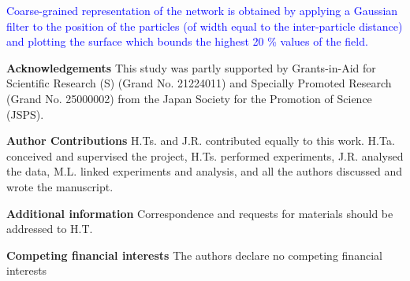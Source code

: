 \documentclass[preprint,amsmath,amssymb,superscriptaddress]{revtex4-1}
\begin{document}
\textcolor{blue}{Coarse-grained representation of the network is obtained by applying a Gaussian filter to the position of the particles (of width equal to the inter-particle distance) and plotting the surface which bounds the highest 20 \% values of the field.}





\bigskip
\noindent
{\bf Acknowledgements} 
This study was partly supported by Grants-in-Aid for Scientific Research (S) (Grand No. 21224011) and Specially Promoted Research (Grand No. 25000002) from the Japan Society for the Promotion of Science (JSPS). 

\medskip
\noindent
{\bf Author Contributions} 
H.Ts. and J.R. contributed equally to this work. 
H.Ta. conceived and supervised the project, H.Ts. performed experiments, J.R. analysed the data, M.L. linked experiments and analysis, and all the authors discussed and wrote the manuscript. 

\medskip
\noindent
{\bf Additional information} 
Correspondence and requests for materials should be addressed to H.T. 

\medskip
\noindent
{\bf Competing financial interests}
The authors declare no competing financial interests



\end{document}
